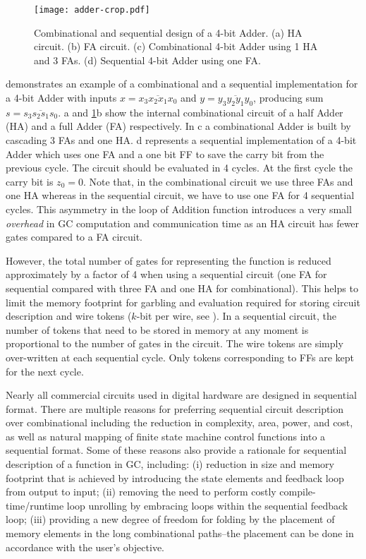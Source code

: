 \begin{figure}[ht]
    \centering
    \texttt{[image: adder-crop.pdf]}
    \caption{Combinational and sequential design of a 4-bit Adder.
  (a) HA circuit.
  (b) FA circuit.
  (c) Combinational 4-bit Adder using 1 HA and 3 FAs.
  (d) Sequential 4-bit Adder using one FA.}\label{fig:combSeq}
\end{figure}

 demonstrates an example of a combinational and a sequential implementation for a 4-bit Adder with inputs $x = \overline{x_3x_2x_1x_0}$ and $y = \overline{y_3y_2y_1y_0}$, producing sum $s = \overline{s_3s_2s_1s_0}$.
a and \ref{fig:combSeq}b show the internal combinational circuit of a half Adder (HA) and a full Adder (FA) respectively.
In c a combinational Adder is built by cascading 3 FAs and one HA.
d represents a sequential implementation of a 4-bit Adder which uses one FA and a one bit FF to save the carry bit from the previous cycle.
The circuit should be evaluated in 4 cycles.
At the first cycle the carry bit is $z_0=0$.
Note that, in the combinational circuit we use three FAs and one HA whereas in the sequential circuit, we have to use one FA for 4 sequential cycles.
This asymmetry in the loop of Addition function introduces a very small \emph{overhead} in GC computation and communication time as an HA circuit has fewer gates compared to a FA circuit.

However, the total number of gates for representing the function is reduced approximately by a factor of 4 when using a sequential circuit (one FA for sequential compared with three FA and one HA for combinational).
This helps to limit the memory footprint for garbling and evaluation required for storing circuit description and wire tokens ($k$-bit per wire, see ).
In a sequential circuit, the number of tokens that need to be stored in memory at any moment is proportional to the number of gates in the circuit.
The wire tokens are simply over-written at each sequential cycle.
Only tokens corresponding to FFs are kept for the next cycle.

Nearly all commercial circuits used in digital hardware are designed in sequential format.
There are multiple reasons for preferring sequential circuit description over combinational including the reduction in complexity, area, power, and cost, as well as natural mapping of finite state machine control functions into a sequential format.
Some of these reasons also provide a rationale for sequential description of a function in GC, including: (i) reduction in size and memory footprint that is achieved by introducing the state elements and feedback loop from output to input; (ii) removing the need to perform costly compile-time/runtime loop unrolling by embracing loops within the sequential feedback loop; (iii) providing a new degree of freedom for folding by the placement of memory elements in the long combinational paths--the placement can be done in accordance with the user's objective.

